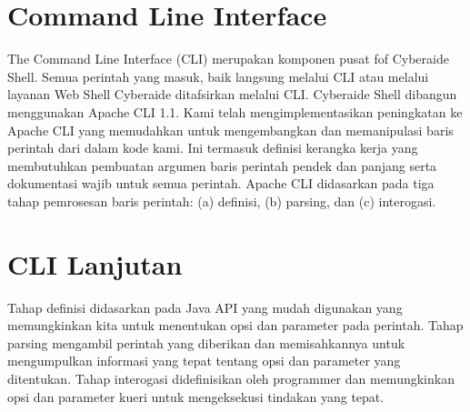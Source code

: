 \documentclass[12pt, times new roman, a4paper]{article}
\begin{document}
\section{Command Line Interface}
The Command Line Interface (CLI) merupakan komponen pusat fof Cyberaide Shell. Semua perintah yang masuk, baik langsung melalui CLI atau melalui layanan Web Shell Cyberaide ditafsirkan melalui CLI. Cyberaide Shell dibangun menggunakan Apache CLI 1.1. Kami telah mengimplementasikan peningkatan ke Apache CLI yang memudahkan untuk mengembangkan dan memanipulasi baris perintah dari dalam kode kami. Ini termasuk definisi kerangka kerja yang membutuhkan pembuatan argumen baris perintah pendek dan panjang serta dokumentasi wajib untuk semua perintah. Apache CLI didasarkan pada tiga tahap pemrosesan baris perintah: (a) definisi, (b) parsing, dan (c) interogasi.

\section{CLI Lanjutan}
Tahap definisi didasarkan pada Java API yang mudah digunakan yang memungkinkan kita untuk menentukan opsi dan parameter pada perintah. Tahap parsing mengambil perintah yang diberikan dan memisahkannya untuk mengumpulkan informasi yang tepat tentang opsi dan parameter yang ditentukan. Tahap interogasi didefinisikan oleh programmer dan memungkinkan opsi dan parameter kueri untuk mengeksekusi tindakan yang tepat. 
\end{document}
